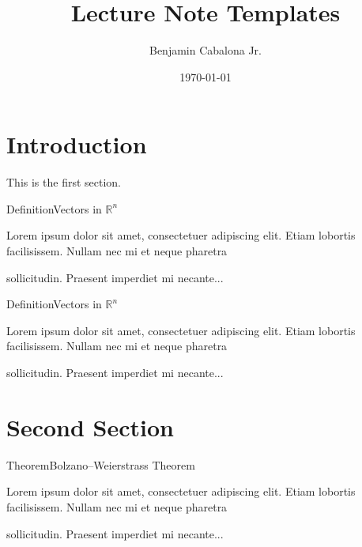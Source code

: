 \documentclass{article}
\title{Lecture Note Templates}
\author{Benjamin Cabalona Jr.}
\date{\today}
\begin{document}
\maketitle

\tableofcontents

\newpage

\section{Introduction}



This is the first section.

\lipsum[1-4] \newline

    \begin{DefinitionBox}[]{Definition}{Vectors in $\mathbb{R}^n$}
        
        Lorem ipsum dolor sit amet, consectetuer adipiscing elit.  
        Etiam lobortis facilisissem.  Nullam nec mi et neque pharetra 
        
        sollicitudin.  Praesent imperdiet mi necante...
    \end{DefinitionBox}

    \begin{PropositionBox}[]{Definition}{Vectors in $\mathbb{R}^n$}
        
        Lorem ipsum dolor sit amet, consectetuer adipiscing elit.  
        Etiam lobortis facilisissem.  Nullam nec mi et neque pharetra 
        
        sollicitudin.  Praesent imperdiet mi necante...
    \end{PropositionBox}

\section{Second Section}

\lipsum[1] \newline

    \begin{TheoremBox}{Theorem}{Bolzano–Weierstrass Theorem}
        
        Lorem ipsum dolor sit amet, consectetuer adipiscing elit.  
        Etiam lobortis facilisissem.  Nullam nec mi et neque pharetra 
        
        sollicitudin.  Praesent imperdiet mi necante...
    \end{TheoremBox}
\end{document}
